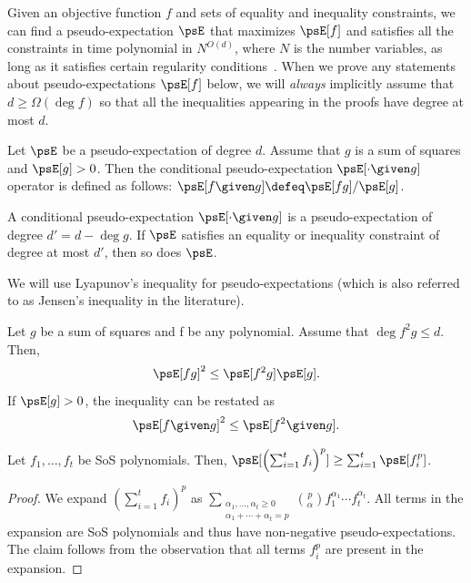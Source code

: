 \documentclass[11pt,a4paper]{article}
\begin{document}
Given an objective function $f$ and sets of equality and inequality constraints, we can find a pseudo-expectation $\psE$ that maximizes $\psE[f]$ and satisfies all the constraints in time polynomial in $N^{O(d)}$, where $N$ is the number variables, as long as it satisfies certain regularity conditions~\cite{RW17}. When we prove any statements about pseudo-expectations $\psE[f]$ below, we will \textit{always} implicitly assume that $d \geq \Omega(\deg f)$ so that all the inequalities appearing in the proofs have degree at most $d$.


\begin{definition}
Let $\psE$ be a pseudo-expectation of degree $d$.
Assume that $g$ is a sum of squares and $\psE[g] > 0$. Then the conditional pseudo-expectation $\psE[\cdot \given g]$ operator is defined as follows: $\psE[f \given g] \defeq \psE[fg]/\psE[g]$.
\end{definition}

\begin{fact}\label{fact:cond-pseudo-is-pseudo}
A conditional pseudo-expectation $\psE[\cdot \given g]$ is a pseudo-expectation of degree $d' = d - \deg g$. If $\psE$ satisfies an equality or inequality constraint of degree at most $d'$, then so does $\psE$.
\end{fact}

We will use Lyapunov's inequality for pseudo-expectations (which is also referred to as Jensen's inequality in the literature).
\begin{claim}
\label{claim:Lyapunov}
Let \(g\) be a sum of squares and f be any polynomial. Assume that $\deg f^2g \leq d$.  Then,
\begin{equation}\label{eq:Lyapunov}
\psE[fg]^2 \le \psE[f^2g]\psE[g].
\end{equation}
If $\psE[g] > 0$, the inequality can be restated as
\begin{equation}\label{eq:condvar_ineq}
\psE[f\given g]^2 \le \psE[f^2\given g].
\end{equation}
\end{claim}
\begin{claim}
\label{claim:sum-f-ineq}
Let $f_1,\dots, f_t$ be SoS polynomials. Then, $\psE[\left(\sum_{i=1}^t f_i\right)^p] \geq \sum_{i=1}^t \psE[f_i^p]$.
\end{claim}
\begin{proof}
We expand $\left(\sum_{i=1}^t f_i\right)^p$ as $\sum_{\substack{\alpha_1, \ldots, \alpha_t \ge 0 \\ \alpha_1 + \cdots + \alpha_t = p}} \binom{p}{\alpha}f_1^{\alpha_1}\cdots f_t^{\alpha_t}$. All terms in the expansion are SoS polynomials and thus have non-negative pseudo-expectations. The claim follows from the observation that all terms $f_i^p$ are present in the expansion.
\end{proof}
\end{document}
